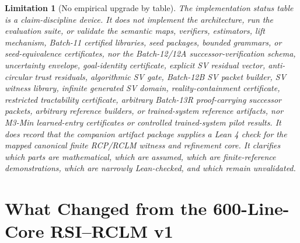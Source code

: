 \documentclass[11pt,a4paper]{article}
\newtheorem{limitation}[theorem]{Limitation}
\begin{document}
\begin{limitation}[No empirical upgrade by table]
The implementation status table is a claim-discipline device. It does not implement the architecture, run the evaluation suite, or validate the semantic maps, verifiers, estimators, lift mechanism, Batch-11 certified libraries, seed packages, bounded grammars, or seed-equivalence certificates, nor the Batch-12/12A successor-verification schema, uncertainty envelope, goal-identity certificate, explicit SV residual vector, anti-circular trust residuals, algorithmic SV gate, Batch-12B SV packet builder, SV witness library, infinite generated SV domain, reality-containment certificate, restricted tractability certificate, arbitrary Batch-13R proof-carrying successor packets, arbitrary reference builders, or trained-system reference artifacts, nor M3-Min learned-entry certificates or controlled trained-system pilot results. It does record that the companion artifact package supplies a Lean 4 check for the mapped canonical finite RCP/RCLM witness and refinement core. It clarifies which parts are mathematical, which are assumed, which are finite-reference demonstrations, which are narrowly Lean-checked, and which remain unvalidated.
\end{limitation}

\section{What Changed from the 600-Line-Core RSI--RCLM v1}
\end{document}
